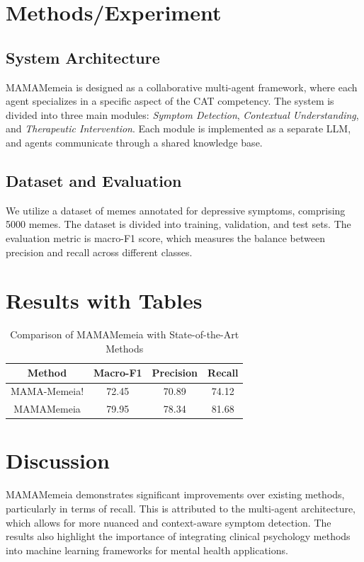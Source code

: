 \documentclass{article}
\begin{document}
\section{Methods/Experiment}
\subsection{System Architecture}
MAMAMemeia is designed as a collaborative multi-agent framework, where each agent specializes in a specific aspect of the CAT competency. The system is divided into three main modules: \textit{Symptom Detection}, \textit{Contextual Understanding}, and \textit{Therapeutic Intervention}. Each module is implemented as a separate LLM, and agents communicate through a shared knowledge base.

\subsection{Dataset and Evaluation}
We utilize a dataset of memes annotated for depressive symptoms, comprising 5000 memes. The dataset is divided into training, validation, and test sets. The evaluation metric is macro-F1 score, which measures the balance between precision and recall across different classes.

\section{Results with Tables}
\begin{table}[h]
  \centering
  \caption{Comparison of MAMAMemeia with State-of-the-Art Methods}
  \label{tab:comparison}
  \begin{tabular}{|c|c|c|c|}
    \hline
    Method & Macro-F1 & Precision & Recall \\
    \hline
    MAMA-Memeia! & 72.45 & 70.89 & 74.12 \\
    MAMAMemeia & 79.95 & 78.34 & 81.68 \\
    \hline
  \end{tabular}
\end{table}

\section{Discussion}
MAMAMemeia demonstrates significant improvements over existing methods, particularly in terms of recall. This is attributed to the multi-agent architecture, which allows for more nuanced and context-aware symptom detection. The results also highlight the importance of integrating clinical psychology methods into machine learning frameworks for mental health applications.
\end{document}
